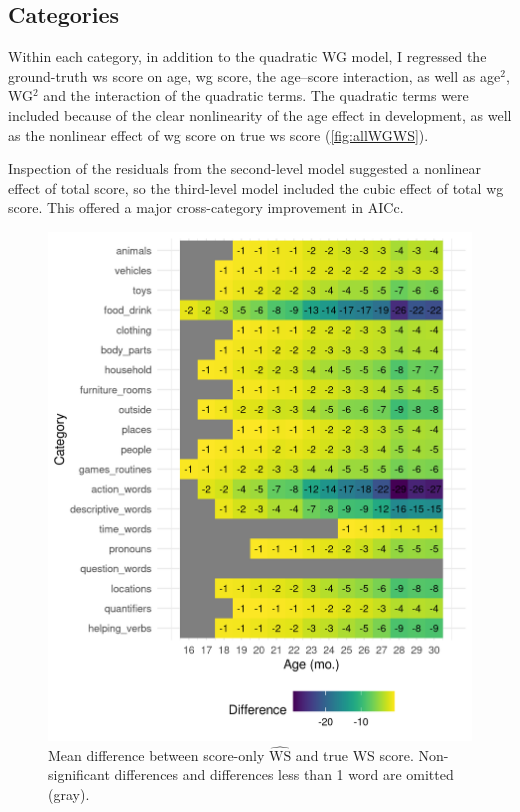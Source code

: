 \documentclass[letterpaper]{article}
\newcommand{\wshat}{$\hat{\textrm{WS}}$}
\begin{document}
    \subsection{Categories}

    Within each
    category, in addition to the quadratic WG model,
    I regressed the ground-truth \gls{ws} score on age,
    \gls{wg} score, the
    age--score interaction, as well as age$^2$, WG$^2$ and the interaction of
    the quadratic terms. The quadratic terms were included because of the
    clear nonlinearity of the age effect in development, as well as the
    nonlinear effect of \gls{wg} score on true \gls{ws} score
    (\autoref{fig:allWGWS}).

    Inspection of the residuals from the second-level model suggested a nonlinear effect
    of total score, so the third-level model included the cubic effect of total \gls{wg}
    score. This offered a major cross-category improvement in AICc.

    \begin{figure}
	    \centering
	    \includegraphics[width=\textwidth]{../WG2WS_plots/WGWS_diff}
	    \caption{Mean difference between score-only \wshat{} and true WS score.
	    			Non-significant differences and differences less than 1 word are
	    			omitted (gray).}
	   	\label{fig:diffs_by_cat}
    \end{figure}
\end{document}
